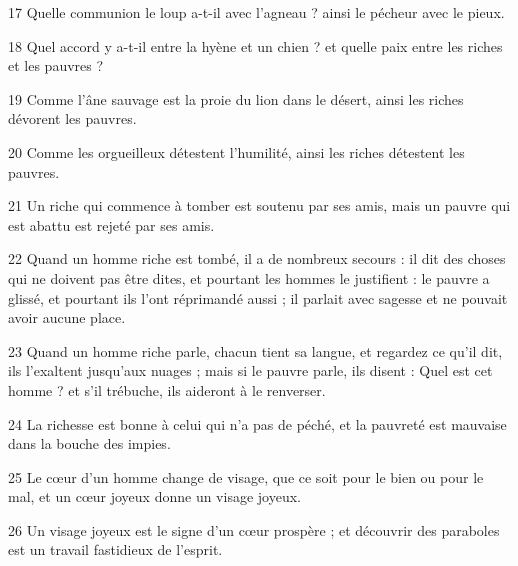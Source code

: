 \par 17 Quelle communion le loup a-t-il avec l'agneau ? ainsi le pécheur avec le pieux.
\par 18 Quel accord y a-t-il entre la hyène et un chien ? et quelle paix entre les riches et les pauvres ?
\par 19 Comme l'âne sauvage est la proie du lion dans le désert, ainsi les riches dévorent les pauvres.
\par 20 Comme les orgueilleux détestent l'humilité, ainsi les riches détestent les pauvres.
\par 21 Un riche qui commence à tomber est soutenu par ses amis, mais un pauvre qui est abattu est rejeté par ses amis.
\par 22 Quand un homme riche est tombé, il a de nombreux secours : il dit des choses qui ne doivent pas être dites, et pourtant les hommes le justifient : le pauvre a glissé, et pourtant ils l'ont réprimandé aussi ; il parlait avec sagesse et ne pouvait avoir aucune place.
\par 23 Quand un homme riche parle, chacun tient sa langue, et regardez ce qu'il dit, ils l'exaltent jusqu'aux nuages ​​; mais si le pauvre parle, ils disent : Quel est cet homme ? et s'il trébuche, ils aideront à le renverser.
\par 24 La richesse est bonne à celui qui n'a pas de péché, et la pauvreté est mauvaise dans la bouche des impies.
\par 25 Le cœur d'un homme change de visage, que ce soit pour le bien ou pour le mal, et un cœur joyeux donne un visage joyeux.
\par 26 Un visage joyeux est le signe d'un cœur prospère ; et découvrir des paraboles est un travail fastidieux de l'esprit.


